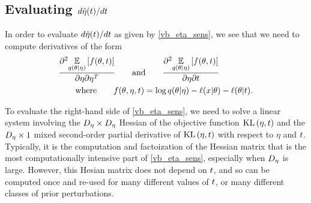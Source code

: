 \subsection{Evaluating $d\hat\eta(t) / dt$}

In order to evaluate $d\hat\eta(t) / dt$ as given by \eqref{vb_eta_sens}, we
see that we need to compute derivatives of the form
%
\begin{align*}
%
&\frac{\partial^2
       \expect{\q(\theta \vert \eta)}{ f(\theta, \t) }}
      {\partial \eta \partial \eta^T}
\mathand
\frac{\partial^2 \expect{\q(\theta \vert \eta)}{f(\theta, \t)}}
      {\partial \eta \partial \t} \\
& \mathwhere
f(\theta, \eta, \t) =
    \log \q(\theta \vert \eta) - \logp(\x \vert \theta) - \logp(\theta \vert \t).
%
\end{align*}



To evaluate the right-hand side of \eqref{vb_eta_sens}, we need to solve a
linear system involving the $D_{\eta} \times D_{\eta}$ Hessian of the objective
function $\mathrm{KL}\left(\eta, t\right)$ and the $D_{\eta} \times 1$ mixed second-order partial
derivative of $\mathrm{KL}\left(\eta, t\right)$ with respect to $\eta$ and $t$.  Typically, it is
the computation and factoization of the Hessian matrix that is the most
computationally intensive part of \eqref{vb_eta_sens}, especially when $D_{\eta}$
is large.  However, this Hesian matrix does not depend on $t$, and so can be
computed once and re-used for many different values of $t$, or many different
classes of prior perturbations.

%
